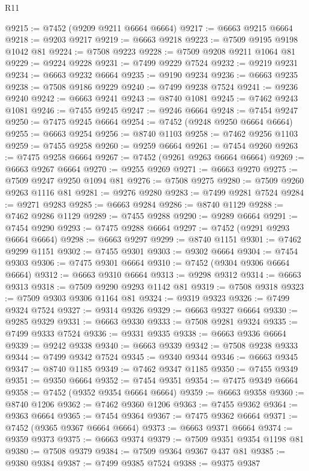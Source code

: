 \begin{lexlean}{R11}
\begin{coremodule}
@9215 := @7452 (@9209 @9211 @6664 @6664)
@9217 := @6663 @9215 @6664
@9218 := @9203 @9217
@9219 := @6663 @9218
@9223 := @7509 @9195 @9198 @1042 @81
@9224 := @7508 @9223
@9228 := @7509 @9208 @9211 @1064 @81
@9229 := @9224 @9228
@9231 := @7499 @9229 @7524
@9232 := @9219 @9231
@9234 := @6663 @9232 @6664
@9235 := @9190 @9234
@9236 := @6663 @9235
@9238 := @7508 @9186 @9229
@9240 := @7499 @9238 @7524
@9241 := @9236 @9240
@9242 := @6663 @9241
@9243 := @8740 @1081
@9245 := @7462 @9243 @1081
@9246 := @7455 @9245
@9247 := @9246 @6664
@9248 := @7454 @9247
@9250 := @7475 @9245 @6664
@9254 := @7452 (@9248 @9250 @6664 @6664)
@9255 := @6663 @9254
@9256 := @8740 @1103
@9258 := @7462 @9256 @1103
@9259 := @7455 @9258
@9260 := @9259 @6664
@9261 := @7454 @9260
@9263 := @7475 @9258 @6664
@9267 := @7452 (@9261 @9263 @6664 @6664)
@9269 := @6663 @9267 @6664
@9270 := @9255 @9269
@9271 := @6663 @9270
@9275 := @7509 @9247 @9250 @1094 @81
@9276 := @7508 @9275
@9280 := @7509 @9260 @9263 @1116 @81
@9281 := @9276 @9280
@9283 := @7499 @9281 @7524
@9284 := @9271 @9283
@9285 := @6663 @9284
@9286 := @8740 @1129
@9288 := @7462 @9286 @1129
@9289 := @7455 @9288
@9290 := @9289 @6664
@9291 := @7454 @9290
@9293 := @7475 @9288 @6664
@9297 := @7452 (@9291 @9293 @6664 @6664)
@9298 := @6663 @9297
@9299 := @8740 @1151
@9301 := @7462 @9299 @1151
@9302 := @7455 @9301
@9303 := @9302 @6664
@9304 := @7454 @9303
@9306 := @7475 @9301 @6664
@9310 := @7452 (@9304 @9306 @6664 @6664)
@9312 := @6663 @9310 @6664
@9313 := @9298 @9312
@9314 := @6663 @9313
@9318 := @7509 @9290 @9293 @1142 @81
@9319 := @7508 @9318
@9323 := @7509 @9303 @9306 @1164 @81
@9324 := @9319 @9323
@9326 := @7499 @9324 @7524
@9327 := @9314 @9326
@9329 := @6663 @9327 @6664
@9330 := @9285 @9329
@9331 := @6663 @9330
@9333 := @7508 @9281 @9324
@9335 := @7499 @9333 @7524
@9336 := @9331 @9335
@9338 := @6663 @9336 @6664
@9339 := @9242 @9338
@9340 := @6663 @9339
@9342 := @7508 @9238 @9333
@9344 := @7499 @9342 @7524
@9345 := @9340 @9344
@9346 := @6663 @9345
@9347 := @8740 @1185
@9349 := @7462 @9347 @1185
@9350 := @7455 @9349
@9351 := @9350 @6664
@9352 := @7454 @9351
@9354 := @7475 @9349 @6664
@9358 := @7452 (@9352 @9354 @6664 @6664)
@9359 := @6663 @9358
@9360 := @8740 @1206
@9362 := @7462 @9360 @1206
@9363 := @7455 @9362
@9364 := @9363 @6664
@9365 := @7454 @9364
@9367 := @7475 @9362 @6664
@9371 := @7452 (@9365 @9367 @6664 @6664)
@9373 := @6663 @9371 @6664
@9374 := @9359 @9373
@9375 := @6663 @9374
@9379 := @7509 @9351 @9354 @1198 @81
@9380 := @7508 @9379
@9384 := @7509 @9364 @9367 @437 @81
@9385 := @9380 @9384
@9387 := @7499 @9385 @7524
@9388 := @9375 @9387

\end{coremodule}
\end{lexlean}
